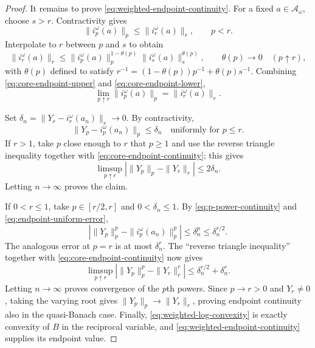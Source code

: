 \documentclass[12pt]{article}
\numberwithin{equation}{section}
\theoremstyle{definition}
\theoremstyle{remark}
\newcommand{\?}{\overset{?}{=}}
\begin{document}
\begin{proof}
It remains to prove \eqref{eq:weighted-endpoint-continuity}.  For a fixed
$a\in\mathcal A_\omega$, choose $s>r$.  Contractivity gives
\begin{equation}
  \|i_p^\omega(a)\|_p\leq\|i_r^\omega(a)\|_r,
  \qquad p<r.
  \label{eq:core-endpoint-upper}
\end{equation}
Interpolate to $r$ between $p$ and $s$ to obtain
\begin{equation}
  \|i_r^\omega(a)\|_r
  \leq\|i_p^\omega(a)\|_p^{1-\theta(p)}
       \|i_s^\omega(a)\|_s^{\theta(p)},
  \qquad \theta(p)\longrightarrow0
  \quad(p\uparrow r),
  \label{eq:core-endpoint-lower}
\end{equation}
with $\theta(p)$ defined to satisfy $r^{-1}=(1-\theta(p))p^{-1}+\theta(p)s^{-1}$. 
Combining \eqref{eq:core-endpoint-upper} and \eqref{eq:core-endpoint-lower},
\begin{equation}
  \lim_{p\uparrow r}\|i_p^\omega(a)\|_p
  =\|i_r^\omega(a)\|_r.
  \label{eq:core-endpoint-continuity}
\end{equation}

Set
$\delta_n=\|Y_r-i_r^\omega(a_n)\|_r\to0$.
By contractivity,
\begin{equation}
  \|Y_p-i_p^\omega(a_n)\|_p\leq\delta_n
  \quad\text{uniformly for }p\leq r.
  \label{eq:endpoint-uniform-error}
\end{equation}
If $r>1$, take $p$ close enough to $r$ that $p\geq1$ and use the reverse
triangle inequality together with
\eqref{eq:core-endpoint-continuity}; this gives
\begin{equation}
  \limsup_{p\uparrow r}
  \left|\|Y_p\|_p-\|Y_r\|_r\right|
  \leq2\delta_n.
\end{equation}
Letting $n\to\infty$ proves the claim.

If $0<r\leq1$, take $p\in[r/2,r]$ and $0<\delta_n\leq1$.  By
\eqref{eq:p-power-continuity} and
\eqref{eq:endpoint-uniform-error},
\begin{equation}
  \left|\|Y_p\|_p^p-
  \|i_p^\omega(a_n)\|_p^p\right|
  \leq\delta_n^p\leq\delta_n^{r/2}.
\end{equation}
The analogous error at $p=r$ is at most $\delta_n^r$.  The ``reverse
triangle inequality'' together with
\eqref{eq:core-endpoint-continuity} now gives
\begin{equation}
  \limsup_{p\uparrow r}
  \left|\|Y_p\|_p^p-\|Y_r\|_r^r\right|
  \leq\delta_n^{r/2}+\delta_n^r.
\end{equation}
Letting $n\to\infty$ proves convergence of the $p$th powers.  Since
$p\to r>0$ and $Y_r\ne0$, taking the varying root gives
$\|Y_p\|_p\to\|Y_r\|_r$, proving endpoint continuity also in the
quasi-Banach case.  Finally, \eqref{eq:weighted-log-convexity} is exactly convexity of
$B$ in the reciprocal variable, and
\eqref{eq:weighted-endpoint-continuity} supplies its endpoint value.
\end{proof}
\end{document}
